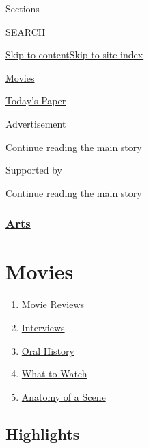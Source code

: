 Sections

SEARCH

\protect\hyperlink{site-content}{Skip to
content}\protect\hyperlink{site-index}{Skip to site index}

\href{https://www.nytimes3xbfgragh.onion/section/movies}{Movies}

\href{https://myaccount.nytimes3xbfgragh.onion/auth/login?response_type=cookie\&client_id=vi}{}

\href{https://www.nytimes3xbfgragh.onion/section/todayspaper}{Today's
Paper}

Advertisement

\protect\hyperlink{after-top}{Continue reading the main story}

Supported by

\protect\hyperlink{after-sponsor}{Continue reading the main story}

\hypertarget{arts}{%
\subsubsection{\texorpdfstring{\href{arts}{Arts}}{Arts}}\label{arts}}

\hypertarget{movies}{%
\section{Movies}\label{movies}}

\begin{enumerate}
\def\labelenumi{\arabic{enumi}.}
\tightlist
\item
  \href{/reviews/movies}{Movie Reviews}
\item
  \href{/spotlight/interviews}{Interviews}
\item
  \href{/spotlight/oral-history}{Oral History}
\item
  \href{/spotlight/what-to-watch}{What to Watch}
\item
  \href{/column/anatomy-of-a-scene}{Anatomy of a Scene}
\end{enumerate}

\hypertarget{highlights}{%
\subsection{Highlights}\label{highlights}}

